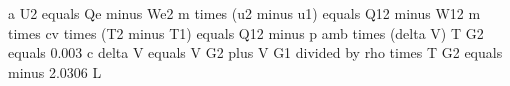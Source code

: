 a U2 equals Qe minus We2  
m times (u2 minus u1) equals Q12 minus W12  
m times cv times (T2 minus T1) equals Q12 minus p amb times (delta V)  
T G2 equals 0.003 c  
delta V equals V G2 plus V G1 divided by rho times T G2 equals minus 2.0306 L